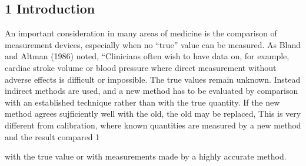 \documentclass[]{article}
\begin{document}
\subsection*{1 Introduction}
An important consideration in many areas of medicine is the comparison of measurement devices, especially when no “true” value can be measured. As Bland and
Altman (1986) noted, “Clinicians often wish to have data on, for example, cardiac stroke volume or blood pressure where direct measurement without adverse effects is
difficult or impossible. The true values remain unknown. Instead indirect methods are used, and a new method has to be evaluated by comparison with an established
technique rather than with the true quantity. If the new method agrees sujﬁciently well with the old, the old may be replaced, This is very different from calibration,
where known quantities are measured by a new method and the result compared
1



with the true value or with measurements made by a highly accurate method.
\end{document}
